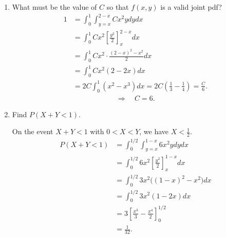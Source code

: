 \documentclass[12pt]{article} %
\newcommand{\Red}{\color{Red}}
\begin{document}
\begin{enumerate}
\begin{enumerate}[label=2.\arabic*]
{\begin{align*}
        \end{align*}
        Equivalently,
        \begin{align*}
        0<x<1,\qquad x<y<2-x.
        \end{align*}
        \begin{center}
        \end{center}
        }
		\item What must be the value of $C$ so that $f(x,y)$ is a valid joint pdf?
        {\Red
        \begin{align*}
        1&=\int_{0}^{1}\int_{y=x}^{2-x} Cx^2ydydx \\
        &=\int_{0}^{1} Cx^2\left[\frac{y^2}{2}\right]_{x}^{2-x} dx \\
        &=\int_{0}^{1} Cx^2\cdot \frac{(2-x)^2-x^2}{2} dx \\
        &=\int_{0}^{1} Cx^2(2-2x) dx \\
        &=2C\int_{0}^{1}(x^2-x^3) dx
        =2C\left(\frac13-\frac14\right)
        =\frac{C}{6}.
        \end{align*}
        \begin{align*}
        \Rightarrow\quad C=6.
        \end{align*}
        }
		\item Find $P(X+Y<1)$.\\
        {\Red
        On the event $X+Y<1$ with $0<X<Y$, we have $X<\tfrac12$.
        \begin{align*}
        P(X+Y<1)&=\int_{0}^{1/2}\int_{y=x}^{1-x} 6x^2ydydx \\
        &=\int_{0}^{1/2} 6x^2\left[\frac{y^2}{2}\right]_{x}^{1-x}dx \\
        &=\int_{0}^{1/2} 3x^2\big((1-x)^2-x^2\big)dx \\
        &=\int_{0}^{1/2} 3x^2(1-2x)dx\\
        &=3\left[\frac{x^3}{3}-\frac{x^4}{2}\right]_{0}^{1/2}\\
        &=\frac{1}{32}.
        \end{align*}

}
\end{enumerate}
\end{enumerate}
\end{document}
